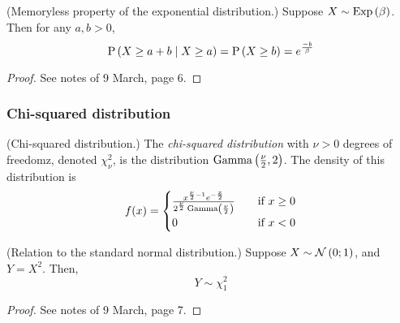 \documentclass[11pt]{article}
\begin{document}
\begin{thm}{(Memoryless property of the exponential distribution.)}
    Suppose $X \sim \operatorname{Exp}\left(\beta\right)$.
    Then for any $a, b > 0$,
    \begin{equation}
        \label{eq:exponential-memoryless}
        \operatorname{P}{\left(X \geq a + b \;\vert\; X \geq a\right)}
        =
        \operatorname{P}{\left(X \geq b\right)}
        =
        e^\frac{-b}{\beta}
    \end{equation}
\end{thm}

\begin{proof}
    See notes of 9 March, page 6.
\end{proof}

\subsubsection{Chi-squared distribution}

\begin{defn}{(Chi-squared distribution.)}
    The \emph{chi-squared distribution} with $\nu > 0$ degrees of freedomz,
    denoted $\chi^2_\nu$, is the distribution $\operatorname{Gamma}\left(\frac{\nu}{2}, 2\right)$.
    The density of this distribution is
    \begin{equation*}
        f(x) = \begin{cases}
            \frac{
                x^{\frac{\nu}{2} - 1} e^{-\frac{x}{2}}
            }{
                2^{\frac{\nu}{2}} \operatorname{Gamma}\left(\frac{\nu}{2}\right)
            }
                &\quad\text{if } x \geq 0 \\
            0   &\quad\text{if } x < 0
        \end{cases}
    \end{equation*}
\end{defn}

\begin{thm}{(Relation to the standard normal distribution.)}
    Suppose $X \sim \operatorname{\mathcal{N}}\left(0;1\right)$, and $Y = X^2$.
    Then,
    \begin{equation}
        \label{eq:square-normal-chi-squared}
        Y \sim \chi^2_1
    \end{equation}
\end{thm}

\begin{proof}
    See notes of 9 March, page 7.
\end{proof}
\end{document}

